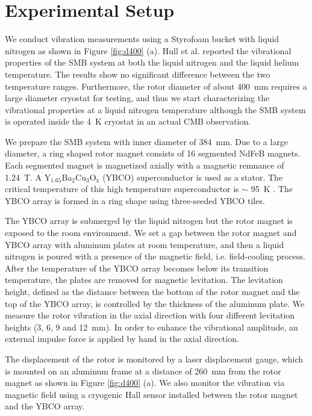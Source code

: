 \documentclass[a4paper,11pt]{jpconf}
\begin{document}
\section{Experimental Setup}


We conduct vibration measurements using a Styrofoam bucket with liquid nitrogen as shown in Figure \ref{fig:d400} (a).
Hull et al. reported the vibrational properties of the SMB system at both the liquid nitrogen and the liquid helium temperature.
The results show no significant difference between the two temperature ranges.
Furthermore, the rotor diameter of about 400~mm requires a large diameter cryostat for testing, and thus we start characterizing the vibrational properties at a liquid nitrogen temperature although the SMB system is operated inside the 4~K cryostat in an actual CMB observation.

We prepare the SMB system with inner diameter of 384~mm.
Due to a large diameter, a ring shaped rotor magnet consists of 16 segmented NdFeB magnets.
Each segmented magnet is magnetized axially with a magnetic remnance of 1.24~T.
A Y$_{1.65}$Ba$_{2}$Cu$_{3}$O$_{\mathrm{x}}$ (YBCO) superconductor is used as a stator.
The critical temperature of this high temperature superconductor is $\sim$ 95~K \cite{Hull}.
The YBCO array is formed in a ring shape using three-seeded YBCO tiles.

The YBCO array is submerged by the liquid nitrogen but the rotor magnet is exposed to the room environment.
We set a gap between the rotor magnet and YBCO array with aluminum plates at room temperature, and then a liquid nitrogen is poured with a presence of the magnetic field, i.e. field-cooling process.
After the temperature of the YBCO array becomes below its transition temperature, the plates are removed for magnetic levitation.
The levitation height, defined as the distance between the bottom of the rotor magnet and the top of the YBCO array, is controlled by the thickness of the aluminum plate.
We measure the rotor vibration in the axial direction with four different levitation heights (3, 6, 9 and 12~mm).
In order to enhance the vibrational amplitude, an external impulse force is applied by hand in the axial direction.

The displacement of the rotor is monitored by a laser displacement gauge,
which is mounted on an aluminum frame at a distance of 260~mm from the rotor magnet as shown in Figure \ref{fig:d400} (a).
We also monitor the vibration via magnetic field using a cryogenic Hall sensor installed between the rotor magnet and the YBCO array.
\end{document}
